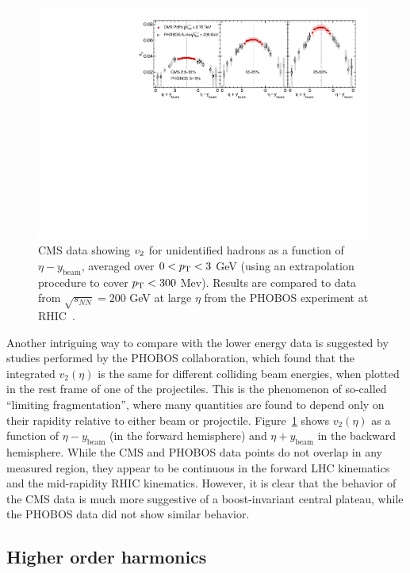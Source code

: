 \begin{figure}[!tb]
\begin{center}
\includegraphics[width=0.98\textwidth]{flowcorrelations_figs/v2_etashifted_3cen_PHOBOS.pdf}
\caption[]{
CMS data showing $\mbox{$v_2$}$ for unidentified hadrons as a function of $\eta - y_{\mathrm{beam}}$, averaged over $0 <\mbox{$p_{\mathrm{T}}$} < 3$ GeV (using an extrapolation procedure to cover $\mbox{$p_{\mathrm{T}}$} <300$ Mev).
Results are compared to data from $\sqrt{s_{NN}}=200$ GeV
at large $\eta$ from the PHOBOS experiment at RHIC~\cite{Chatrchyan:2012ta}.
}
\label{fig:pas:fc:limfrag}
\end{center}
\end{figure}
Another intriguing way to compare with the lower energy data is suggested by studies performed by the PHOBOS
collaboration, which found that the integrated $v_2(\eta)$ is the same for different colliding beam energies,
when plotted in the rest frame of one of the projectiles.  This is the phenomenon of so-called
``limiting fragmentation'', where many quantities are found to depend only on their rapidity relative to either
beam or projectile.  
Figure~\ref{fig:pas:fc:limfrag} shows $v_2(\eta)$ as a function of $\eta - y_{\mathrm{beam}}$ (in the forward
hemisphere) and $\eta + y_{\mathrm{beam}}$ in the backward hemisphere.
While the CMS and PHOBOS data points do not overlap in any measured region, they appear to be continuous
in the forward LHC kinematics and the mid-rapidity RHIC kinematics.
However, it is clear that the behavior of the CMS data is much more suggestive of a boost-invariant central
plateau, while the PHOBOS data did not show similar behavior.

\subsection{Higher order harmonics}

